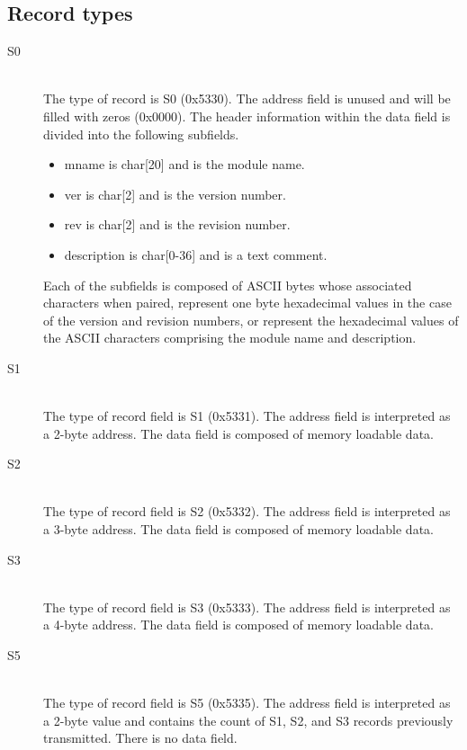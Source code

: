     \subsection{Record types}
        \begin{description}
            \item[S0]~\\
                The type of record is S0 (0x5330). The address field is unused and will be filled with zeros (0x0000). The header information within the data field is divided into the following subfields.

                \begin{itemize}
                    \item mname is char[20] and is the module name.
                    \item ver is char[2] and is the version number.
                    \item rev is char[2] and is the revision number.
                    \item description is char[0-36] and is a text comment.
                \end{itemize}

                Each of the subfields is composed of ASCII bytes whose associated characters when paired, represent one byte hexadecimal values in the case of the version and revision numbers, or represent the hexadecimal values of the ASCII characters comprising the module name and description.

            \item[S1]~\\
                The type of record field is S1 (0x5331). The address field is interpreted as a 2-byte address. The data field is composed of memory loadable data.

            \item[S2]~\\
                The type of record field is S2 (0x5332). The address field is interpreted as a 3-byte address. The data field is composed of memory loadable data.

            \item[S3]~\\
                The type of record field is S3 (0x5333). The address field is interpreted as a 4-byte address. The data field is composed of memory loadable data.

            \item[S5]~\\
                The type of record field is S5 (0x5335). The address field is interpreted as a 2-byte value and contains the count of S1, S2, and S3 records previously transmitted. There is no data field.


\end{description}
